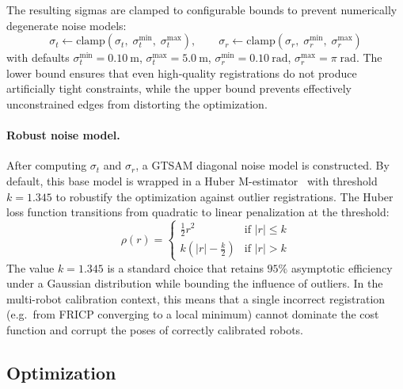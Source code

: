 \begin{enumerate}
          The resulting sigmas are clamped to configurable bounds to
          prevent numerically degenerate noise models:
          \begin{equation}
              \sigma_t \leftarrow
                  \mathrm{clamp}\!\left(\sigma_t,\;
                  \sigma_t^{\min},\; \sigma_t^{\max}\right), \qquad
              \sigma_r \leftarrow
                  \mathrm{clamp}\!\left(\sigma_r,\;
                  \sigma_r^{\min},\; \sigma_r^{\max}\right)
          \end{equation}
          with defaults
          $\sigma_t^{\min} = \SI{0.10}{\metre}$,
          $\sigma_t^{\max} = \SI{5.0}{\metre}$,
          $\sigma_r^{\min} = \SI{0.10}{\radian}$,
          $\sigma_r^{\max} = \pi\;\mathrm{rad}$.
          The lower bound ensures that even high-quality registrations do
          not produce artificially tight constraints, while the upper bound
          prevents effectively unconstrained edges from distorting the
          optimization.
\end{enumerate}

\paragraph{Robust noise model.}
After computing $\sigma_t$ and $\sigma_r$, a GTSAM diagonal noise model is
constructed.
By default, this base model is wrapped in a Huber
M-estimator~\cite{huber_robust} with threshold $k = 1.345$ to robustify
the optimization against outlier registrations.
The Huber loss function transitions from quadratic to linear penalization at
the threshold:
\begin{equation}
    \rho(r) =
    \begin{cases}
        \frac{1}{2} r^2                & \text{if } |r| \leq k \\
        k \left(|r| - \frac{k}{2}\right) & \text{if } |r| > k
    \end{cases}
\end{equation}
The value $k = 1.345$ is a standard choice that retains $95\%$ asymptotic
efficiency under a Gaussian distribution while bounding the influence of
outliers.
In the multi-robot calibration context, this means that a single
incorrect registration (e.g.\ from FRICP converging to a local minimum)
cannot dominate the cost function and corrupt the poses of correctly
calibrated robots.

\subsection{Optimization}

